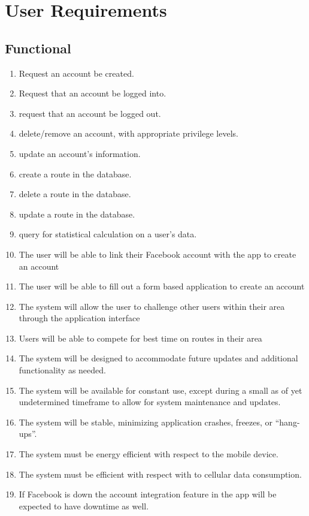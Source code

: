 ﻿\documentclass{article}
\begin{document}
\section{User Requirements}
\subsection{Functional}
\begin{enumerate}
    \item Request an account be created.
    \item Request that an account be logged into.
    \item request that an account be logged out.
    \item delete/remove an account, with appropriate privilege levels.
    \item update an account's information.
    \item create a route in the database.
    \item delete a route in the database.
    \item update a route in the database.
    \item query for statistical calculation on a user's data.
    \item The user will be able to link their Facebook account with the app to create an account
    \item The user will be able to fill out a form based application to create an account
    \item The system will allow the user to challenge other users within their area through the application interface
    \item Users will be able to compete for best time on routes in their area
    \item The system will be designed to accommodate future updates and additional functionality as needed.
    \item The system will be available for constant use, except during a small as of yet undetermined timeframe to allow for system maintenance and updates.
    \item The system will be stable, minimizing application crashes, freezes, or “hang-ups”.
    \item The system must be energy efficient with respect to the mobile device.
    \item The system must be efficient with respect with to cellular data consumption.
    \item If Facebook is down the account integration feature in the app will be expected to have downtime as well.

\end{enumerate}
\end{document}

